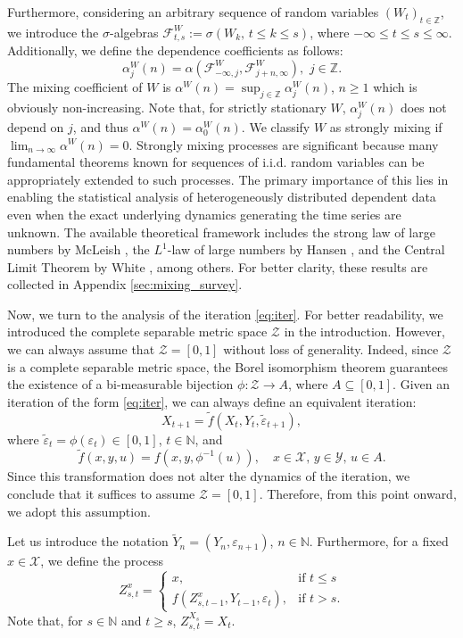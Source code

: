 \documentclass[a4paper,10pt]{article}
\newcommand{\N}{\mathbb{N}}
\newcommand{\Z}{\mathbb{Z}}
\newcommand{\F}{\mathcal{F}}
\newcommand{\X}{\mathcal{X}}
\newcommand{\Y}{\mathcal{Y}}
\newcommand{\eps}{\varepsilon}
\begin{document}
Furthermore, considering an arbitrary sequence of random variables $(W_t)_{t\in\Z}$, we introduce the $\sigma$-algebras $\F_{t,s}^W:=\sigma \left(W_k,\,t\le k\le s\right)$, where $-\infty\le t\le s\le\infty$.
Additionally, we define the dependence coefficients as follows: 
$$\alpha_j^W (n) = \alpha\left(\F_{-\infty,j}^W,\F_{j+n,\infty}^W\right),\,\,j\in\Z.$$ 
The mixing coefficient of $W$ is $\alpha^W (n)= \sup_{j\in\Z}\alpha_j^W (n)$, $n\ge 1$ which is obviously non-increasing. Note that, for strictly stationary $W$, $\alpha_j^W (n)$ does not depend on $j$, and thus $\alpha^W (n)=\alpha_0^W (n)$. We classify $W$ as strongly mixing if $\lim_{n\to\infty}\alpha^W(n)=0$.
Strongly mixing processes are significant because many fundamental theorems known for sequences of i.i.d. random variables can be appropriately extended to such processes. The primary importance of this lies in enabling the statistical analysis of heterogeneously distributed dependent data even when the exact underlying dynamics generating the time series are unknown. The available theoretical framework includes the strong law of large numbers by McLeish \cite{McLeish}, the $L^1$-law of large numbers by Hansen \cite{hansen2019weak}, and the Central Limit Theorem by White \cite{white2000}, among others. For better clarity, these results are collected in Appendix \ref{sec:mixing_survey}.

\medskip
Now, we turn to the analysis of the iteration \eqref{eq:iter}.
For better readability, we introduced the complete separable metric space $\mathcal{Z}$ in the introduction. However, we can always assume that $\mathcal{Z} = [0,1]$ without loss of generality.
Indeed, since $\mathcal{Z}$ is a complete separable metric space, the Borel isomorphism theorem guarantees the existence of a bi-measurable bijection $\phi: \mathcal{Z} \to A$, where $A \subseteq [0,1]$. Given an iteration of the form \eqref{eq:iter}, we can always define an equivalent iteration:
$$
X_{t+1} = \tilde{f}(X_t, Y_t, \tilde{\eps}_{t+1}),
$$
where $\tilde{\eps}_t = \phi(\eps_t) \in [0,1]$, $t \in \N$, and
$$
\tilde{f} (x,y,u) = f(x,y,\phi^{-1}(u)), \quad x \in \X,\, y \in \Y,\, u \in A.
$$
Since this transformation does not alter the dynamics of the iteration, we conclude that it suffices to assume $\mathcal{Z} = [0,1]$. Therefore, from this point onward, we adopt this assumption.

Let us introduce the notation $\tilde{Y}_n = (Y_n,\eps_{n+1})$, $n\in\N$. Furthermore, for a fixed $x\in\X$, we define the process
\begin{equation}\label{eq:Z}
Z_{s,t}^{x} = \begin{cases}
x, & \text{if}\,\, t\le s \\
f\left(Z_{s,t-1}^{x},Y_{t-1},\eps_t\right), & \text{if}\,\, t>s.
\end{cases}
\end{equation}
Note that, for $s\in\N$ and $t\ge s$, $Z_{s,t}^{X_s}=X_t$.
\end{document}
